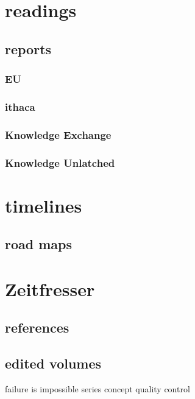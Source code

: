 \documentclass[output=guidelines,guidelines] {langscibook}
\begin{document}
\chapter{readings}
\section{reports}
\subsection{EU}
\subsection{ithaca}
\subsection{Knowledge Exchange}
\subsection{Knowledge Unlatched}
\chapter{timelines}
\section{road maps}
\chapter{Zeitfresser}
\section{references}
\section{edited volumes}

failure is impossible
series concept
quality control
\end{document}
